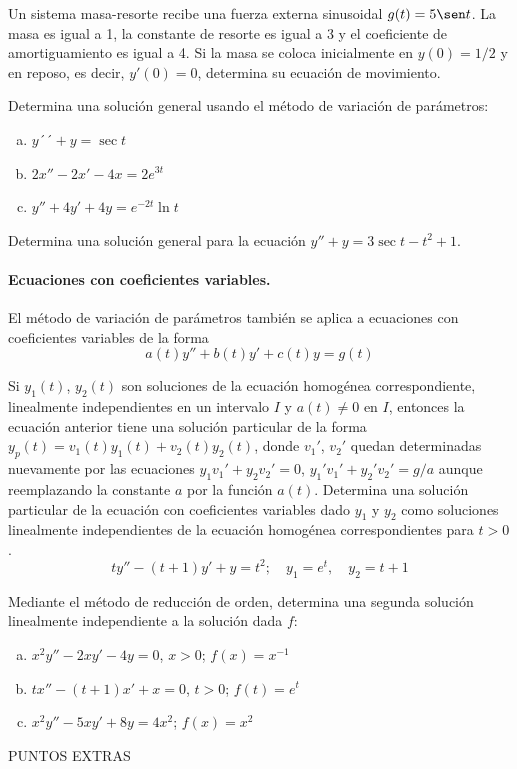 \documentclass[12pt]{exam}
\begin{document}
\begin{questions}
     \question%
     Un sistema masa-resorte recibe una fuerza externa sinusoidal $g(t)=5\sen t$. La masa es igual a 1, la constante de resorte es igual a 3 y el coeficiente de amortiguamiento es igual a 4. Si la masa se coloca inicialmente en $y(0)=1/2$ y en reposo, es decir, $y'(0)=0$, determina su ecuación de movimiento.


     \question%
     Determina una solución general usando el método de variación de parámetros:
     \begin{enumerate}[a)]
     	\item $y´´+y=\sec t$
        \item $2x''-2x'-4x=2e^{3t}$
        \item $y''+4y'+4y=e^{-2t}\ln t$
\end{enumerate}


     
     
     \question%
     Determina una solución general para la ecuación $y''+y=3\sec t-t^2+1$.
     

     
     \paragraph{Ecuaciones con coeficientes variables.} El método de variación de parámetros también se aplica a ecuaciones con coeficientes variables de la forma $$a(t)y''+b(t)y'+c(t)y=g(t)$$
     
     Si $y_1(t)$, $y_2(t)$ son soluciones de la ecuación homogénea correspondiente, linealmente independientes en un intervalo $I$ y $a(t)\neq0$ en $I$, entonces la ecuación anterior tiene una solución particular de la forma $y_p(t)=v_1(t)y_1(t)+v_2(t)y_2(t)$, donde $v_1'$, $v_2'$ quedan determinadas nuevamente por las ecuaciones $y_1v_1'+y_2v_2'=0$, $y_1'v_1'+y_2'v_2'=g/a$ aunque reemplazando la constante $a$ por la función $a(t)$.
    \question%
     Determina una solución particular de la ecuación con coeficientes variables dado $y_1$ y $y_2$ como soluciones linealmente independientes de la ecuación homogénea correspondientes para $t>0$.$$ty''-(t+1)y'+y=t^2;\quad y_1=e^t,\quad y_2=t+1$$


     \question%
    Mediante el método de reducción de orden, determina una segunda solución linealmente independiente a la solución dada $f$:
    \begin{enumerate}[a)]
        \item $x^2y''-2xy'-4y=0$,  $x>0$;  $f(x)=x^{-1}$
        \item $tx''-(t+1)x'+x=0$,  $t>0$;  $f(t)=e^t$
        \item $x^2y''-5xy'+8y=4x^2$;  $f(x)=x^2$
    \end{enumerate}

     

     
     
        \end{questions}
        \vskip30pt
   PUNTOS EXTRAS %
	
\end{document}
